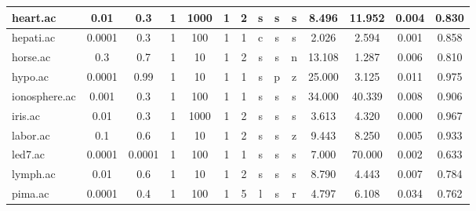 \begin{table}[htbp]
\begin{tabular}{|l|c|c|c|c|c|c|c|c|c||c|c|c|c|}
		\hline
		heart.ac       & 0.01     & 0.3         & 1              & 1000                & 1             & 2             & s      & s        & s        & 8.496          & 11.952         & 0.004          & 0.830          \\
		\hline
		hepati.ac      & 0.0001   & 0.3         & 1              & 100                 & 1             & 1             & c      & s        & s        & 2.026          & 2.594          & 0.001          & 0.858          \\
		\hline
		horse.ac       & 0.3      & 0.7         & 1              & 10                  & 1             & 2             & s      & s        & n        & 13.108         & 1.287          & 0.006          & 0.810          \\
		\hline
		hypo.ac        & 0.0001   & 0.99        & 1              & 10                  & 1             & 1             & s      & p        & z        & 25.000         & 3.125          & 0.011          & 0.975          \\
		\hline
		ionosphere.ac  & 0.001    & 0.3         & 1              & 100                 & 1             & 1             & s      & s        & s        & 34.000         & 40.339         & 0.008          & 0.906          \\
		\hline
		iris.ac        & 0.01     & 0.3         & 1              & 1000                & 1             & 2             & s      & s        & s        & 3.613          & 4.320          & 0.000          & 0.967          \\
		\hline
		labor.ac       & 0.1      & 0.6         & 1              & 10                  & 1             & 2             & s      & s        & z        & 9.443          & 8.250          & 0.005          & 0.933          \\
		\hline
		led7.ac        & 0.0001   & 0.0001      & 1              & 100                 & 1             & 1             & s      & s        & s        & 7.000          & 70.000         & 0.002          & 0.633          \\
		\hline
		lymph.ac       & 0.01     & 0.6         & 1              & 10                  & 1             & 2             & s      & s        & s        & 8.790          & 4.443          & 0.007          & 0.784          \\
		\hline
		pima.ac        & 0.0001   & 0.4         & 1              & 100                 & 1             & 5             & l      & s        & r        & 4.797          & 6.108          & 0.034          & 0.762          \\

\end{tabular}
\end{table}
